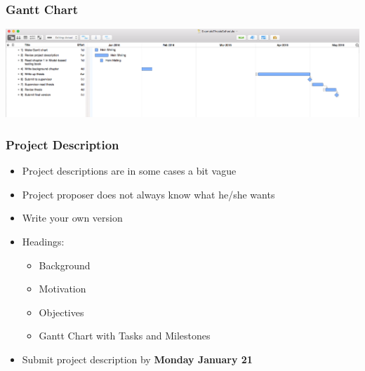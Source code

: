 \documentclass[hyperref={pdfpagelabels=false}, aspectratio=1610,handout]{beamer}
\begin{document}
\begin{frame}
\frametitle{Gantt Chart}
 \begin{center}
  \includegraphics[scale=0.25]{fig/gantt-example}
 \end{center}
\end{frame}


\begin{frame}
\frametitle{Project Description}
\begin{block}{}
 \begin{itemize}
  \item Project descriptions are in some cases a bit vague
  \item Project proposer does not always know what he/she wants
  \item Write your own version
  \item Headings:
  \begin{itemize}
  	\item Background
	\item Motivation
	\item Objectives
	\item Gantt Chart with Tasks and Milestones
  \end{itemize}
  \item Submit project description by \textbf{Monday January 21}
 \end{itemize}
\end{block}
\end{frame}
\end{document}
